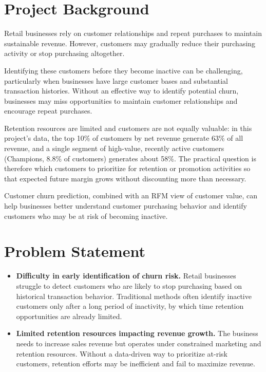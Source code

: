 \section{Project Background}
\label{sec:1-1}

Retail businesses rely on customer relationships and repeat purchases to maintain sustainable revenue. However, customers may gradually reduce their purchasing activity or stop purchasing altogether.

Identifying these customers before they become inactive can be challenging, particularly when businesses have large customer bases and substantial transaction histories. Without an effective way to identify potential churn, businesses may miss opportunities to maintain customer relationships and encourage repeat purchases.

Retention resources are limited and customers are not equally valuable: in this project's data, the top 10\% of customers by net revenue generate 63\% of all revenue, and a single segment of high-value, recently active customers (Champions, 8.8\% of customers) generates about 58\%. The practical question is therefore which customers to prioritize for retention or promotion activities so that expected future margin grows without discounting more than necessary.

Customer churn prediction, combined with an RFM view of customer value, can help businesses better understand customer purchasing behavior and identify customers who may be at risk of becoming inactive.

\section{Problem Statement}
\label{sec:1-2}

\begin{itemize}
    \item \textbf{Difficulty in early identification of churn risk.} Retail businesses struggle to detect customers who are likely to stop purchasing based on historical transaction behavior. Traditional methods often identify inactive customers only after a long period of inactivity, by which time retention opportunities are already limited.
    \item \textbf{Limited retention resources impacting revenue growth.} The business needs to increase sales revenue but operates under constrained marketing and retention resources. Without a data-driven way to prioritize at-risk customers, retention efforts may be inefficient and fail to maximize revenue.
\end{itemize}

